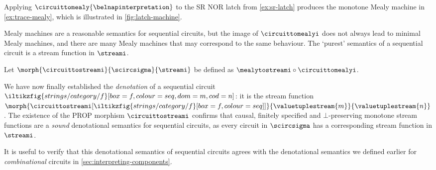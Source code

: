 

\begin{example}\label{ex:mealy-translation}
    Applying \(\circuittomealy{\belnapinterpretation}\) to the SR NOR latch from
    \cref{ex:sr-latch} produces the monotone Mealy machine in
    \cref{ex:trace-mealy}, which is illustrated in \cref{fig:latch-machine}.
\end{example}



Mealy machines are a reasonable semantics for sequential circuits, but the
image of \(\circuittomealyi\) does not always lead to minimal Mealy machines,
and there are many Mealy machines that may correspond to the same behaviour.
The `purest' semantics of a sequential circuit is a stream function in
\(\streami\).

\begin{definition}
    Let \(\morph{\circuittostreami}{\scircsigma}{\streami}\) be defined as
    \(\mealytostreami \circ \circuittomealyi\).
\end{definition}

We have now finally established the \emph{denotation} of a sequential circuit \(
\iltikzfig{strings/category/f}[box=f,colour=seq,dom=m,cod=n]
\): it is the stream function \(
\morph{\circuittostreami[\iltikzfig{strings/category/f}[box=f,colour=seq]]}{\valuetuplestream{m}}{\valuetuplestream{n}}
\).
The existence of the PROP morphism \(\circuittostreami\) confirms that causal,
finitely specified and \(\bot\)-preserving monotone stream functions are a
\emph{sound} denotational semantics for sequential circuits, as every circuit in
\(\scircsigma\) has a corresponding stream function in \(\streami\).

It is useful to verify that this denotational semantics of sequential circuits
agrees with the denotational semantics we defined earlier for
\emph{combinational} circuits in \cref{sec:interpreting-components}.


